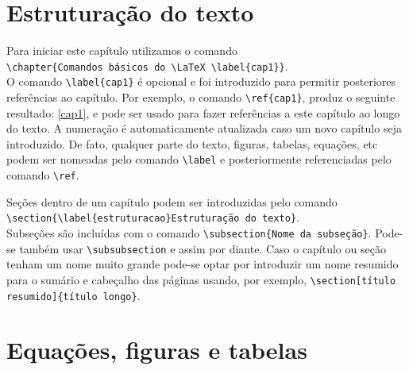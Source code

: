 \newpage


\section{\label{estruturacao}Estruturação do texto}

Para iniciar este capítulo utilizamos o comando \\ \verb+\chapter{Comandos básicos do \LaTeX \label{cap1}}+.\\ O comando \verb+\label{cap1}+ é opcional e foi introduzido para permitir posteriores referências ao capítulo. Por exemplo, o comando \verb+\ref{cap1}+, produz o seguinte resultado: \ref{cap1}, e pode ser usado para fazer referências a este capítulo ao longo do texto. A numeração é automaticamente atualizada caso um novo capítulo seja introduzido. De fato, qualquer parte do texto, figuras, tabelas, equações, etc podem ser nomeadas pelo comando \verb+\label+ e posteriormente referenciadas pelo comando \verb+\ref+.

Seções dentro de um capítulo podem ser introduzidas pelo comando \\ \verb+\section{\label{estruturacao}Estruturação do texto}+. \\ Subseções são incluídas com o comando \verb+\subsection{Nome da subseção}+. Pode-se também usar \verb+\subsubsection+ e assim por diante. Caso o capítulo ou seção tenham um nome muito grande pode-se optar por introduzir um  nome resumido para o sumário e cabeçalho das páginas usando, por exemplo, \verb+\section[título resumido]{título longo}+.

\section{Equações, figuras e tabelas}

